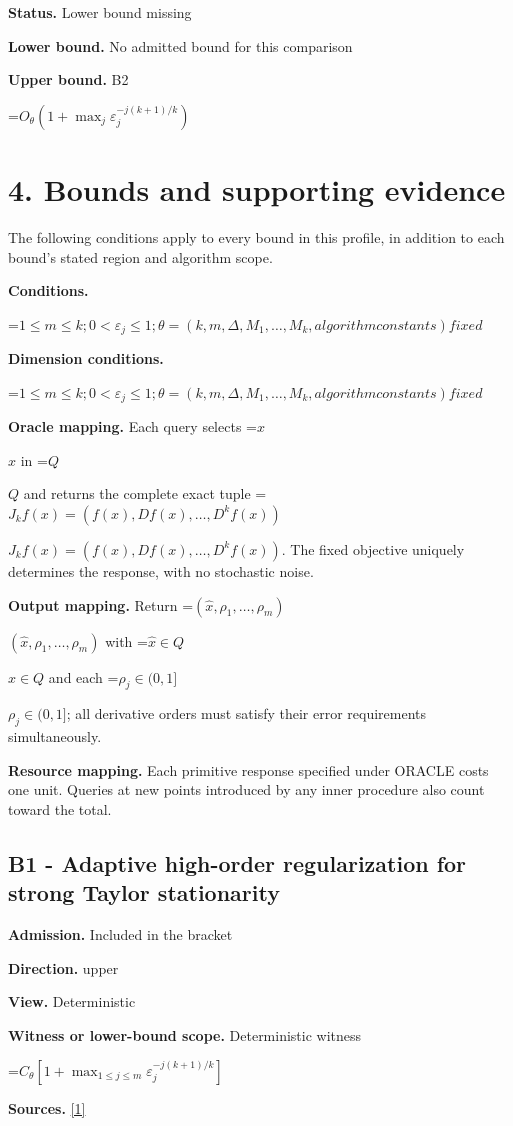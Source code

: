 \documentclass[10pt,a4paper]{article}
\newcommand{\AtlasMath}[1]{\par\begingroup\centering\setbox0=\hbox{$\displaystyle #1$}\ifdim\wd0>1.4\linewidth\typeout{ATLAS WIDE FORMULA: \the\wd0}\fi\ifdim\wd0>\linewidth\resizebox{\linewidth}{!}{\box0}\else\box0\fi\par\endgroup}
\newcommand{\AtlasInlineMath}[1]{\begingroup\setbox0=\hbox{$#1$}\ifdim\wd0>.4\linewidth\endgroup\AtlasMath{#1}\else\endgroup$#1$\fi}
\begin{document}
\textbf{Status.} Lower bound missing

\textbf{Lower bound.} No admitted bound for this comparison

\textbf{Upper bound.} B2

\AtlasMath{O_\theta(1+\max_j \varepsilon_j^{-j(k+1)/k})}
\section{4. Bounds and supporting evidence}
The following conditions apply to every bound in this profile, in addition to each bound's stated region and algorithm scope.

\textbf{Conditions.} 
\AtlasMath{1\le m\le k;0<\varepsilon_j\le 1;\theta=(k,m,\Delta,M_1,\ldots,M_k,algorithm constants) fixed}


\textbf{Dimension conditions.} 
\AtlasMath{1\le m\le k;0<\varepsilon_j\le 1;\theta=(k,m,\Delta,M_1,\ldots,M_k,algorithm constants) fixed}


\textbf{Oracle mapping.} Each query selects \AtlasInlineMath{x} in \AtlasInlineMath{Q} and returns the complete exact tuple \AtlasInlineMath{J_{k}f(x)=(f(x),Df(x),\ldots,D^{k}f(x))}. The fixed objective uniquely determines the response, with no stochastic noise.

\textbf{Output mapping.} Return \AtlasInlineMath{(\widehat{x},\rho_1,\ldots,\rho_m)} with \AtlasInlineMath{\widehat{x}\in Q} and each \AtlasInlineMath{\rho_j\in(0,1]}; all derivative orders must satisfy their error requirements simultaneously.

\textbf{Resource mapping.} Each primitive response specified under ORACLE costs one unit. Queries at new points introduced by any inner procedure also count toward the total.

\subsection{B1 - Adaptive high-order regularization for strong Taylor stationarity}
\textbf{Admission.} Included in the bracket

\textbf{Direction.} upper

\textbf{View.} Deterministic

\textbf{Witness or lower-bound scope.} Deterministic witness

\AtlasMath{C_\theta[1+\max_{1\le j\le m}\varepsilon_j^{-j(k+1)/k}]}
\textbf{Sources.} \href{https://optimization-online.org/wp-content/uploads/2020/01/7590.pdf}{[1]}
\end{document}

